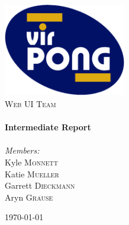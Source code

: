 \begin{titlepage}

\begin{center}


\includegraphics[width=0.40\textwidth]{./logo.png}\\[1cm]    

\textsc{\LARGE Web UI Team}\\[1.5cm]



\HRule \\[0.4cm]
{ \huge \bfseries Intermediate Report}\\[0.4cm]
\HRule \\[1.5cm]

\emph{Members:}\\
Kyle \textsc{Monnett}\\
Katie \textsc{Mueller}\\
Garrett \textsc{Dieckmann}\\
Aryn \textsc{Grause}\\

\vfill

{\large \today}

\end{center}

\end{titlepage}